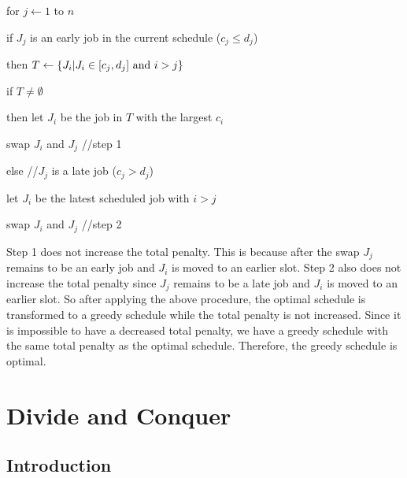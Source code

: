 \documentclass{article}
\begin{document}
\begin{itemize}
\qquad for $j\leftarrow 1$ to $n$
\par\qquad\qquad if $J_j$ is an early job in the current schedule
($c_j\le d_j$)
\par\qquad\qquad then $T\leftarrow\{J_i|J_i\in [c_j,d_j]{\rm\ and\ }
i>j\}$
\par\qquad\qquad\qquad if $T\not=\emptyset$
\par\qquad\qquad\qquad then let $J_i$ be the job in $T$ with the largest $c_i$
\par\qquad\qquad\qquad\qquad swap $J_i$ and $J_j$  //step 1
\par\qquad\qquad else //$J_j$ is a late job ($c_j>d_j$)
\par\qquad\qquad\qquad let $J_i$ be the latest scheduled job with 
$i>j$
\par\qquad\qquad\qquad swap $J_i$ and $J_j$  //step 2 

Step 1 does not increase the total penalty. This is because
after the swap $J_j$ remains to be an early job and $J_i$
is moved to an earlier slot. Step 2 also does not increase the
total penalty since $J_j$ remains to be a late job and $J_i$
is moved to an earlier slot. So after applying the above
procedure, the optimal schedule is transformed to a greedy
schedule while the total penalty is not increased. Since 
it is impossible to have a decreased total penalty, we have
a greedy schedule with the same total penalty as the optimal
schedule. Therefore, the greedy schedule is optimal.
 
\end{itemize}

\newpage

\section{Divide and Conquer}

\subsection{Introduction}

\end{document}
